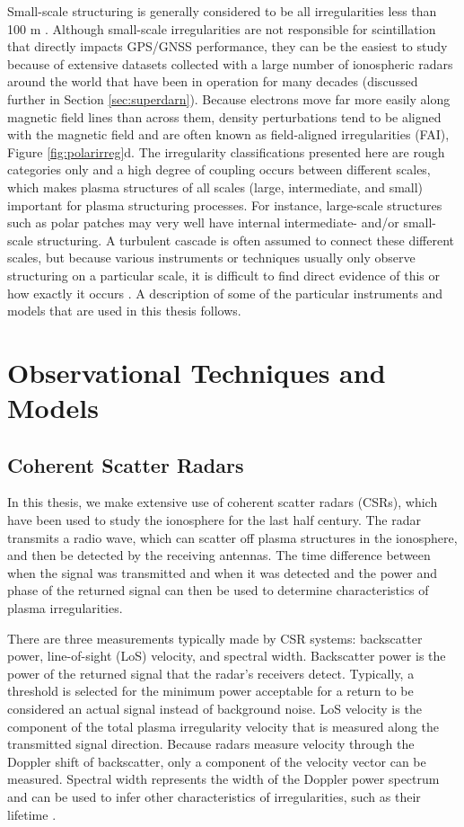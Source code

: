 Small-scale structuring is generally considered to be all irregularities less than 100 m \citep{Kelley2009}.  Although small-scale irregularities are not responsible for scintillation that directly impacts GPS/GNSS performance, they can be the easiest to study because of extensive datasets collected with a large number of ionospheric radars around the world that have been in operation for many decades (discussed further in Section \ref{sec:superdarn}).  Because electrons move far more easily along magnetic field lines than across them, density perturbations tend to be aligned with the magnetic field and are often known as field-aligned irregularities (FAI), Figure \ref{fig:polarirreg}d.  The irregularity classifications presented here are rough categories only and a high degree of coupling occurs between different scales, which makes plasma structures of all scales (large, intermediate, and small) important for plasma structuring processes.  For instance, large-scale structures such as polar patches may very well have internal intermediate- and/or small-scale structuring.  A turbulent cascade is often assumed to connect these different scales, but because various instruments or techniques usually only observe structuring on a particular scale, it is difficult to find direct evidence of this or how exactly it occurs \citep{Kintner1985,Tsunoda1985}.  A description of some of the particular instruments and models that are used in this thesis follows.

\section{Observational Techniques and Models}

\subsection{Coherent Scatter Radars}
\label{sec:csr}
In this thesis, we make extensive use of coherent scatter radars (CSRs), which have been used to study the ionosphere for the last half century.  The radar transmits a radio wave, which can scatter off plasma structures in the ionosphere, and then be detected by the receiving antennas.  The time difference between when the signal was transmitted and when it was detected and the power and phase of the returned signal can then be used to determine characteristics of plasma irregularities.

There are three measurements typically made by CSR systems: backscatter power, line-of-sight (LoS) velocity, and spectral width.  Backscatter power is the power of the returned signal that the radar's receivers detect.  Typically, a threshold is selected for the minimum power acceptable for a return to be considered an actual signal instead of background noise.  LoS velocity is the component of the total plasma irregularity velocity that is measured along the transmitted signal direction.  Because radars measure velocity through the Doppler shift of backscatter, only a component of the velocity vector can be measured.  Spectral width represents the width of the Doppler power spectrum and can be used to infer other characteristics of irregularities, such as their lifetime \citep{Greenwald1985}.

